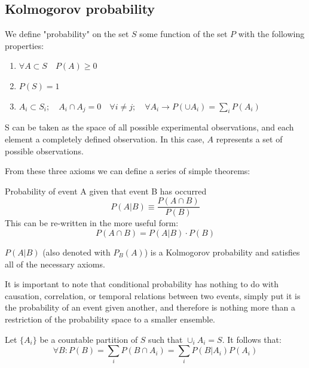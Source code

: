 \subsection{Kolmogorov probability}
\label{subsec:kolmogorov}

	We define "probability" on the set $S$ some function of the set $P$ with the following properties:
\begin{enumerate}
	
	\item $\forall A \subset S \quad P(A)\geq 0$
	\item $P(S) = 1$
	\item $A_i \subset S_i ;\quad A_i\cap A_j = 0 \quad \forall i\neq j ;\quad \forall A_i \rightarrow P(\cup A_i) = \sum\limits_{i}P(A_i)$
	
\end{enumerate}

S can be taken as the space of all possible experimental observations, and each element a completely defined observation. In this case, $A$ represents a set of possible observations.


From these three axioms we can define a series of simple theorems:


\begin{definition}
	Probability of event A given that event B has occurred
	\[
	P(A|B) \equiv \frac{P(A\cap B)}{P(B)}
	\]
This can be re-written in the more useful form:
	\[
	P(A\cap B)= P(A|B)\cdot P(B)
	\]
\end{definition}

$P(A|B)$ (also denoted with $P_B(A)$) is a Kolmogorov probability and satisfies all of the necessary axioms.

It is important to note that conditional probability has nothing to do with causation, correlation, or temporal relations between two events, simply put it is the probability of an event given another, and therefore is nothing more than a restriction of the probability space to a smaller ensemble. 

\begin{theorem}
	Let $\{A_i\}$ be a countable partition of $S$ such that $\cup_i A_i = S$. It follows that:
	\[
	\forall B: P(B)=\sum_i P(B\cap A_i) = \sum_i P(B|A_i)P(A_i)
	\]
\label{th:total_prob_law}
\end{theorem}

